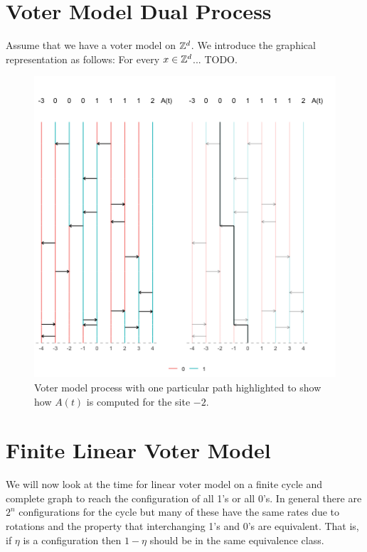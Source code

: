 \section{Voter Model Dual Process}

Assume that we have a voter model on $\mathbb{Z}^d$.
We introduce the graphical representation as follows: For every $x \in \mathbb{Z}^d$... TODO.

\begin{figure}[H]
  \centering
    \includegraphics[width=1\textwidth]{figures/voter_model_dual.png}
   \caption{Voter model process with one particular path highlighted to show how $A(t)$ is computed for the site $-2$.}
  \label{fig:voter_model_dual}
\end{figure}

\section{Finite Linear Voter Model}
We will now look at the time for linear voter model on a finite cycle and complete graph to reach the configuration of all 1's or all 0's.
In general there are $2^n$ configurations for the cycle but many of these have the same rates due to rotations and the property that interchanging 1's and 0's are equivalent.
That is, if $\eta$ is a configuration then $1 - \eta$ should be in the same equivalence class.

